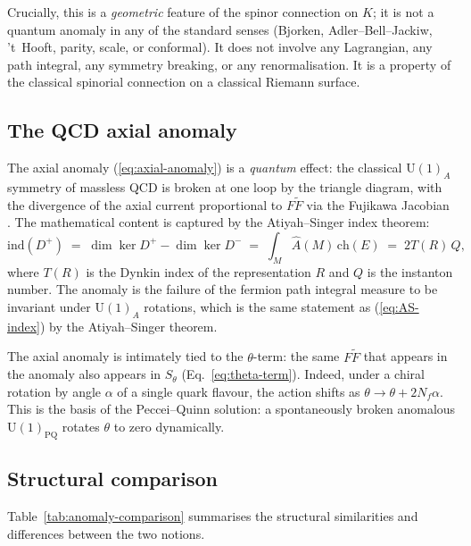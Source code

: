 \documentclass[11pt,a4paper]{article}
\theoremstyle{plain}
\theoremstyle{definition}
\theoremstyle{remark}
\begin{document}
Crucially, this is a \emph{geometric} feature of the spinor connection
on $K$; it is not a quantum anomaly in any of the standard senses
(Bjorken, Adler--Bell--Jackiw, 't~Hooft, parity, scale, or conformal).
It does not involve any Lagrangian, any path integral, any symmetry
breaking, or any renormalisation.  It is a property of the classical
spinorial connection on a classical Riemann surface.

\subsection{The QCD axial anomaly}\label{ssec:axial-anomaly}

The axial anomaly (\ref{eq:axial-anomaly}) is a \emph{quantum} effect:
the classical $\mathrm{U}(1)_A$ symmetry of massless QCD is broken at
one loop by the triangle diagram, with the divergence of the axial
current proportional to $F\tilde F$ via the Fujikawa Jacobian
\cite{adler1969, belljackiw1969, fujikawa1979, tHooft1976}.  The
mathematical content is captured by the Atiyah--Singer index theorem:
\begin{equation}\label{eq:AS-index}
  \mathrm{ind}(D^+) \;=\; \dim\ker D^+ - \dim\ker D^- \;=\;
  \int_M \hat A(M)\,\mathrm{ch}(E) \;=\; 2T(R)\, Q,
\end{equation}
where $T(R)$ is the Dynkin index of the representation $R$ and $Q$ is
the instanton number.  The anomaly is the failure of the fermion path
integral measure to be invariant under $\mathrm{U}(1)_A$ rotations,
which is the same statement as (\ref{eq:AS-index}) by the
Atiyah--Singer theorem.

The axial anomaly is intimately tied to the $\theta$-term: the same
$F\tilde F$ that appears in the anomaly also appears in $S_\theta$
(Eq.~\ref{eq:theta-term}).  Indeed, under a chiral rotation by angle
$\alpha$ of a single quark flavour, the action shifts as
$\theta\to\theta + 2N_f\alpha$.  This is the basis of the
Peccei--Quinn solution: a spontaneously broken anomalous
$\mathrm{U}(1)_{\mathrm{PQ}}$ rotates $\theta$ to zero dynamically.

\subsection{Structural comparison}\label{ssec:anomaly-table}

Table~\ref{tab:anomaly-comparison} summarises the structural
similarities and differences between the two notions.
\end{document}
